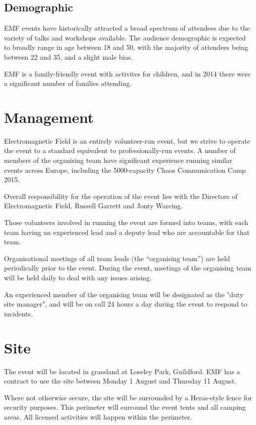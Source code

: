 \subsection{Demographic}

EMF events have historically attracted a broad spectrum of attendees due to the variety of talks
and workshops available. The audience demographic is expected to broadly range in age between
18 and 50, with the majority of attendees being between 22 and 35, and a slight male bias.

EMF is a family-friendly event with activites for children, and in 2014 there were a significant
number of families attending.

\section{Management}

Electromagnetic Field is an entirely volunteer-run event, but we strive to operate the event to
a standard equivalent to professionally-run events. A number of members of the organising team have
significant experience running similar events across Europe, including the 5000-capacity
Chaos Communication Camp 2015.

Overall responsibility for the operation of the event lies with the Directors of Electromagnetic Field,
Russell Garrett and Jonty Wareing.

Those volunteers involved in running the event are formed into teams, with each team having an
experienced lead and a deputy lead who are accountable for that team.

Organisational meetings of all team leads (the ``organising team'') are held periodically prior to the event.
During the event, meetings of the organising team will be held daily to deal with any issues arising.

An experienced member of the organising team will be designated as the "duty site manager", and will be
on call 24 hours a day during the event to respond to incidents.

\section{Site}

The event will be located in grassland at Loseley Park, Guildford. EMF has a contract to use the site between
Monday 1 August and Thursday 11 August.

Where not otherwise secure, the site will be surrounded by a Heras-style fence for security purposes.
This perimeter will surround the event tents and all camping areas. All licensed activities will happen
within the perimeter.


